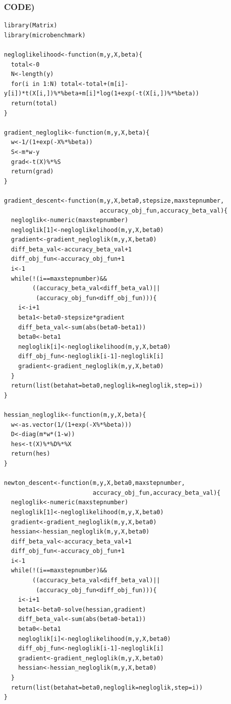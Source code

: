 \documentclass{article}
\begin{document}
\newpage

\subsubsection*{CODE)}

\begin{lstlisting}[basicstyle=\tiny]
library(Matrix)
library(microbenchmark)

negloglikelihood<-function(m,y,X,beta){
  total<-0
  N<-length(y)
  for(i in 1:N) total<-total+(m[i]-y[i])*t(X[i,])%*%beta+m[i]*log(1+exp(-t(X[i,])%*%beta))
  return(total)
}

gradient_negloglik<-function(m,y,X,beta){
  w<-1/(1+exp(-X%*%beta))
  S<-m*w-y
  grad<-t(X)%*%S
  return(grad)
}

gradient_descent<-function(m,y,X,beta0,stepsize,maxstepnumber,
                           accuracy_obj_fun,accuracy_beta_val){
  negloglik<-numeric(maxstepnumber)
  negloglik[1]<-negloglikelihood(m,y,X,beta0)
  gradient<-gradient_negloglik(m,y,X,beta0)
  diff_beta_val<-accuracy_beta_val+1
  diff_obj_fun<-accuracy_obj_fun+1
  i<-1
  while(!(i==maxstepnumber)&&
        ((accuracy_beta_val<diff_beta_val)||
         (accuracy_obj_fun<diff_obj_fun))){
    i<-i+1
    beta1<-beta0-stepsize*gradient
    diff_beta_val<-sum(abs(beta0-beta1))
    beta0<-beta1
    negloglik[i]<-negloglikelihood(m,y,X,beta0)
    diff_obj_fun<-negloglik[i-1]-negloglik[i]
    gradient<-gradient_negloglik(m,y,X,beta0)
  }
  return(list(betahat=beta0,negloglik=negloglik,step=i))
}

hessian_negloglik<-function(m,y,X,beta){
  w<-as.vector(1/(1+exp(-X%*%beta)))
  D<-diag(m*w*(1-w))
  hes<-t(X)%*%D%*%X
  return(hes)
}

newton_descent<-function(m,y,X,beta0,maxstepnumber,
                         accuracy_obj_fun,accuracy_beta_val){
  negloglik<-numeric(maxstepnumber)
  negloglik[1]<-negloglikelihood(m,y,X,beta0)
  gradient<-gradient_negloglik(m,y,X,beta0)
  hessian<-hessian_negloglik(m,y,X,beta0)
  diff_beta_val<-accuracy_beta_val+1
  diff_obj_fun<-accuracy_obj_fun+1
  i<-1
  while(!(i==maxstepnumber)&&
        ((accuracy_beta_val<diff_beta_val)||
         (accuracy_obj_fun<diff_obj_fun))){
    i<-i+1
    beta1<-beta0-solve(hessian,gradient)
    diff_beta_val<-sum(abs(beta0-beta1))
    beta0<-beta1
    negloglik[i]<-negloglikelihood(m,y,X,beta0)
    diff_obj_fun<-negloglik[i-1]-negloglik[i]
    gradient<-gradient_negloglik(m,y,X,beta0)
    hessian<-hessian_negloglik(m,y,X,beta0)
  }
  return(list(betahat=beta0,negloglik=negloglik,step=i))
}


\end{lstlisting}
\end{document}
